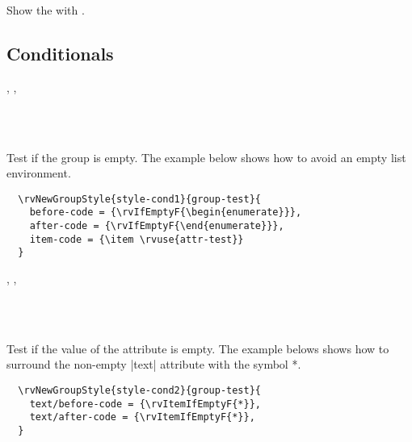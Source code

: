 \documentclass[full]{l3doc}
\begin{document}
\begin{documentation}
\begin{function}{\rvshow}
  \begin{syntax}
      
  \end{syntax}

  Show the  with .
\end{function}

\subsection{Conditionals}

\begin{function}{\rvIfEmptyT, \rvIfEmptyF, \rvIfEmptyTF}
  \begin{syntax}
       \\
      \\
     
  \end{syntax}

  Test if the group is empty. The example below shows how to avoid an empty
  list environment.
\end{function}

\begin{verbatim}
  \rvNewGroupStyle{style-cond1}{group-test}{
    before-code = {\rvIfEmptyF{\begin{enumerate}}},
    after-code = {\rvIfEmptyF{\end{enumerate}}},
    item-code = {\item \rvuse{attr-test}}
  }
\end{verbatim}

\begin{function}{\rvItemIfEmptyT, \rvItemIfEmptyF, \rvItemIfEmptyTF}
  \begin{syntax}
       \\
      \\
     
  \end{syntax}

  Test if the value of the attribute is empty. The example belows shows how to
  surround the non-empty |text| attribute with the symbol *.
\end{function}

\begin{verbatim}
  \rvNewGroupStyle{style-cond2}{group-test}{
    text/before-code = {\rvItemIfEmptyF{*}},
    text/after-code = {\rvItemIfEmptyF{*}},
  }
\end{verbatim}


\end{documentation}
\end{document}
